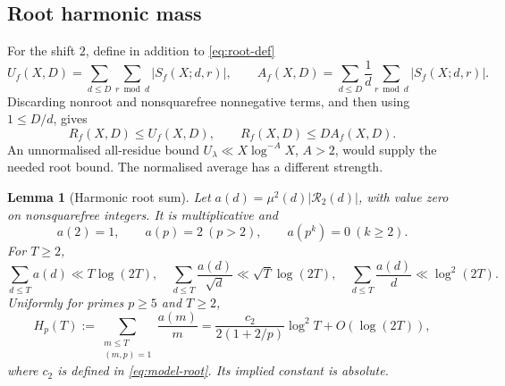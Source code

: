 \documentclass[11pt]{article}
\newtheorem{lemma}[theorem]{Lemma}
\theoremstyle{definition}
\theoremstyle{remark}
\numberwithin{equation}{section}
\begin{document}
\subsection{Root harmonic mass}
For the shift $2$, define in addition to \eqref{eq:root-def}
\begin{equation}\label{eq:b-averages}
 U_f(X,D)=\sum_{d\le D}\sum_{r\bmod d}|S_f(X;d,r)|,\qquad
 A_f(X,D)=\sum_{d\le D}\frac1d\sum_{r\bmod d}|S_f(X;d,r)|.
\end{equation}
Discarding nonroot and nonsquarefree nonnegative terms, and then using $1\le D/d$, gives
\begin{equation}\label{eq:b-comparison}
 R_f(X,D)\le U_f(X,D),\qquad R_f(X,D)\le DA_f(X,D).
\end{equation}
An unnormalised all-residue bound $U_\lambda\ll X\log^{-A}X$, $A>2$, would supply the needed root bound.
The normalised average has a different strength.
\begin{lemma}[Harmonic root sum]\label{lem:b-harmonic}
Let $a(d)=\mu^2(d)|\mathcal R_2(d)|$, with value zero on nonsquarefree integers. It is multiplicative and
\begin{equation}\label{eq:b-local-a}
 a(2)=1,\qquad a(p)=2\ (p>2),\qquad a(p^k)=0\ (k\ge2).
\end{equation}
For $T\ge2$,
\begin{equation}\label{eq:b-divisors}
 \sum_{d\le T}a(d)\ll T\log(2T),\quad
 \sum_{d\le T}\frac{a(d)}{\sqrt d}\ll\sqrt T\log(2T),\quad
 \sum_{d\le T}\frac{a(d)}d\ll\log^2(2T).
\end{equation}
Uniformly for primes $p\ge5$ and $T\ge2$,
\begin{equation}\label{eq:b-harmonic}
 H_p(T):=\sum_{\substack{m\le T\\(m,p)=1}}\frac{a(m)}m
 =\frac{c_2}{2(1+2/p)}\log^2T+O(\log(2T)),
\end{equation}
where $c_2$ is defined in \eqref{eq:model-root}. Its implied constant is absolute.
\end{lemma}
\end{document}
